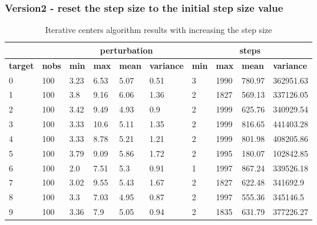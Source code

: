 \documentclass{article}
\begin{document}
\subsubsection{Version2 - reset the step size to the initial step size value}
\begin{table}[h]
\caption{Iterative centers algorithm results with increasing the step size}
\label{tab:iterative_result_new_init}
\begin{tabular}{|l|l|l|l|l|l|l|l|l|l|}
\hline
\textbf{}       & \textbf{}     & \multicolumn{4}{c|}{\textbf{perturbation}}                      & \multicolumn{4}{c|}{\textbf{steps}}                             \\ \hline
\textbf{target} & \textbf{nobs} & \textbf{min} & \textbf{max} & \textbf{mean} & \textbf{variance} & \textbf{min} & \textbf{max} & \textbf{mean} & \textbf{variance} \\ \hline
0 & 100  & 3.23     & 6.53     & 5.07      & 0.51          & 3         & 1990      & 780.97     & 362951.63      \\ \hline
1 & 100  & 3.8      & 9.16     & 6.06      & 1.36          & 2         & 1827      & 569.13     & 337126.05      \\ \hline
2 & 100  & 3.42     & 9.49     & 4.93      & 0.9           & 2         & 1999      & 625.76     & 340929.54      \\ \hline
3 & 100  & 3.33     & 10.6     & 5.11      & 1.35          & 2         & 1999      & 816.65     & 441403.28      \\ \hline
4 & 100  & 3.33     & 8.78     & 5.21      & 1.21          & 2         & 1999      & 801.98     & 408205.86      \\ \hline
5 & 100  & 3.79     & 9.09     & 5.86      & 1.72          & 2         & 1995      & 180.07     & 102842.85      \\ \hline
6 & 100  & 2.0      & 7.51     & 5.3       & 0.91          & 1         & 1997      & 867.24     & 339526.18      \\ \hline
7 & 100  & 3.02     & 9.55     & 5.43      & 1.67          & 2         & 1827      & 622.48     & 341692.9       \\ \hline
8 & 100  & 3.3      & 7.03     & 4.95      & 0.87          & 2         & 1997      & 555.36     & 345146.5       \\ \hline
9 & 100  & 3.36     & 7.9      & 5.05      & 0.94          & 2         & 1835      & 631.79     & 377226.27      \\ \hline
\end{tabular}
\end{table}
\end{document}
